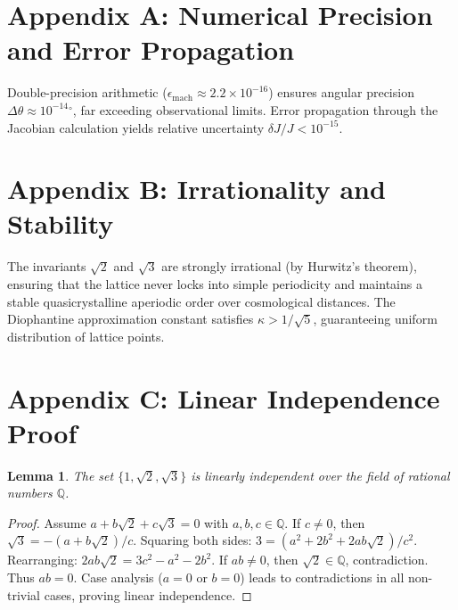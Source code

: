 \documentclass[12pt,a4paper,oneside]{article}
\theoremstyle{plain}
\newtheorem{lemma}[theorem]{Lemma}
\theoremstyle{definition}
\theoremstyle{remark}
\begin{document}
\appendix
\section*{Appendix A: Numerical Precision and Error Propagation}
Double-precision arithmetic ($\epsilon_{\mathrm{mach}} \approx 2.2 \times 10^{-16}$) ensures angular precision $\Delta\theta \approx 10^{-14}{}^\circ$, far exceeding observational limits. Error propagation through the Jacobian calculation yields relative uncertainty $\delta J/J < 10^{-15}$.

\section*{Appendix B: Irrationality and Stability}
The invariants $\sqrt{2}$ and $\sqrt{3}$ are strongly irrational (by Hurwitz's theorem), ensuring that the lattice never locks into simple periodicity and maintains a stable quasicrystalline aperiodic order over cosmological distances. The Diophantine approximation constant satisfies $\kappa > 1/\sqrt{5}$, guaranteeing uniform distribution of lattice points.

\section*{Appendix C: Linear Independence Proof}
\begin{lemma}
The set $\{1, \sqrt{2}, \sqrt{3}\}$ is linearly independent over the field of rational numbers $\mathbb{Q}$.
\end{lemma}
\begin{proof}
Assume $a + b\sqrt{2} + c\sqrt{3} = 0$ with $a,b,c \in \mathbb{Q}$. If $c \neq 0$, then $\sqrt{3} = -(a + b\sqrt{2})/c$. Squaring both sides: $3 = (a^2 + 2b^2 + 2ab\sqrt{2})/c^2$. Rearranging: $2ab\sqrt{2} = 3c^2 - a^2 - 2b^2$. If $ab \neq 0$, then $\sqrt{2} \in \mathbb{Q}$, contradiction. Thus $ab = 0$. Case analysis ($a=0$ or $b=0$) leads to contradictions in all non-trivial cases, proving linear independence.
\end{proof}
\end{document}

